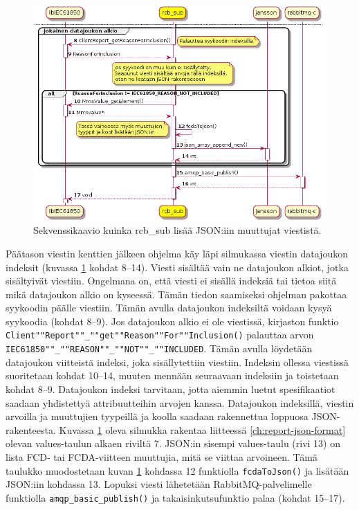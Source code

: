 \begin{figure}[ht!]
	\includegraphics[width=1\textwidth]{pictures/rcb-sub-report-to-json_001.png}
	\caption{Sekvenssikaavio kuinka rcb\_sub lisää JSON:iin muuttujat viestistä.}
	\label{fig:rcb-sub-report-to-json-2}
\end{figure}

Päätason viestin kenttien jälkeen ohjelma käy läpi silmukassa viestin datajoukon indeksit (kuvassa \ref{fig:rcb-sub-report-to-json-2} kohdat 8--14). Viesti sisältää vain ne datajoukon alkiot, jotka sisältyivät viestiin. Ongelmana on, että viesti ei sisällä indeksiä tai tietoa siitä mikä datajoukon alkio on kyseessä. Tämän tiedon saamiseksi ohjelman pakottaa syykoodin päälle viestiin. Tämän avulla datajoukon indeksiltä voidaan kysyä syykoodia (kohdat 8--9). Jos datajoukon alkio ei ole viestissä, kirjaston funktio \texttt{Client""Report""\_""get""Reason""For""Inclusion()} palauttaa arvon \texttt{IEC61850""\_""REASON""\_""NOT""\_""INCLUDED}. Tämän avulla löydetään datajoukon viitteistä indeksi, joka sisällytettiin viestiin. Indeksin ollessa viestissä suoritetaan kohdat 10--14, muuten mennään seuraavaan indeksiin ja toistetaan kohdat 8--9. Datajoukon indeksi tarvitaan, jotta aiemmin luetut spesifikaatiot saadaan yhdistettyä attribuutteihin arvojen kanssa. Datajoukon indeksillä, viestin arvoilla ja muuttujien tyypeillä ja koolla saadaan rakennettua loppuosa JSON-rakenteesta. Kuvassa \ref{fig:rcb-sub-report-to-json-2} oleva silmukka rakentaa liitteessä \ref{ch:report-json-format} olevan values-taulun alkaen riviltä 7. JSON:in sisempi values-taulu (rivi 13) on lista FCD- tai FCDA-viitteen muuttujia, mitä se viittaa arvoineen. Tämä taulukko muodostetaan kuvan \ref{fig:rcb-sub-report-to-json-2} kohdassa 12 funktiolla \texttt{fcdaToJson()} ja lisätään JSON:iin kohdassa 13. Lopuksi viesti lähetetään RabbitMQ-palvelimelle funktiolla \texttt{amqp\_basic\_publish()} ja takaisinkutsufunktio palaa (kohdat 15--17).